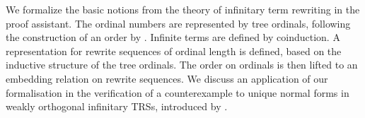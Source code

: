
We formalize the basic notions from the theory of infinitary
term rewriting in the \Coq proof assistant. The ordinal numbers are
represented by tree ordinals, following the construction of an order
by \citet{hancock-08}. Infinite terms are defined by coinduction. A
representation for rewrite sequences of ordinal length is defined,
based on the inductive structure of the tree ordinals. The order on
ordinals is then lifted to an embedding relation on rewrite sequences.
We discuss an application of our formalisation in the verification of
a counterexample to unique normal forms in weakly orthogonal
infinitary TRSs, introduced by \citet{endrullis-10}.


